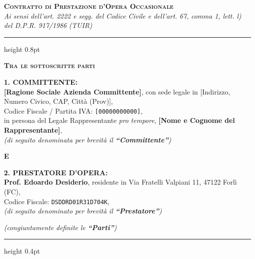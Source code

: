 \documentclass[11pt,a4paper]{article}
\begin{document}
\begin{center}
  {\Large\bfseries\scshape Contratto di Prestazione d'Opera Occasionale}\\[0.4em]
  {\small\itshape Ai sensi dell'art. 2222 e segg. del Codice Civile e dell'art. 67, comma 1, lett. l) del D.P.R. 917/1986 (TUIR)}
\end{center}

\vspace{0.4em}
\hrule height 0.8pt
\vspace{1.2em}

\begin{center}
  {\bfseries\scshape Tra le sottoscritte parti}
\end{center}

\vspace{0.5em}

\noindent
\textbf{1. COMMITTENTE:}\\
\textbf{[Ragione Sociale Azienda Committente]}, con sede legale in [Indirizzo, Numero Civico, CAP, Città (Prov)],\\
Codice Fiscale / Partita IVA: \texttt{[00000000000]},\\
in persona del Legale Rappresentante \emph{pro tempore}, \textbf{[Nome e Cognome del Rappresentante]},\\
\emph{(di seguito denominata per brevità il \textbf{``Committente''})}

\vspace{0.8em}
\begin{center}
  \textbf{E}
\end{center}
\vspace{0.4em}

\noindent
\textbf{2. PRESTATORE D'OPERA:}\\
\textbf{Prof. Edoardo Desiderio}, residente in Via Fratelli Valpiani 11, 47122 Forlì (FC),\\
Codice Fiscale: \texttt{DSDDRD01R31D704K},\\
\emph{(di seguito denominato per brevità il \textbf{``Prestatore''})}

\vspace{0.8em}
\begin{center}
  \small\itshape (congiuntamente definite le \textbf{``Parti''})
\end{center}

\vspace{0.6em}
\hrule height 0.4pt
\vspace{0.8em}
\end{document}
